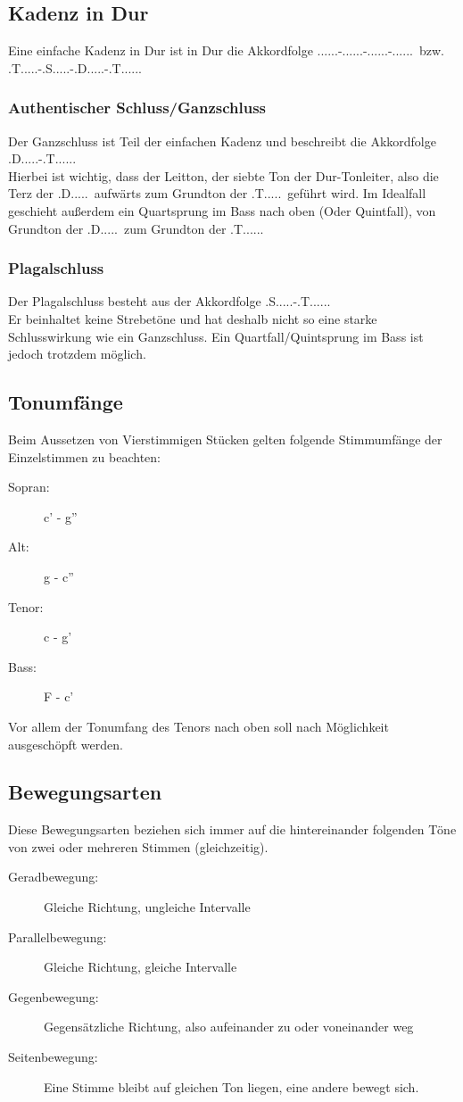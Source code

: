 \documentclass[a4paper]{article}
\newcommand{\dS}[1]{\HH.\uppercase\expandafter{\romannumeral #1\relax}.....} %
\newcommand{\T}{\HH.T.....}
\renewcommand{\S}{\HH.S.....}
\newcommand{\D}{\HH.D.....}
\begin{document}
	\subsection{Kadenz in Dur}
	Eine einfache Kadenz in Dur ist in Dur die Akkordfolge \dS{1}-\dS{4}-\dS{5}-\dS{1}\ bzw.\\ \T-\S-\D-\T.
	\subsubsection{Authentischer Schluss/Ganzschluss}
	Der Ganzschluss ist Teil der einfachen Kadenz und beschreibt die Akkordfolge \D-\T.\\
	Hierbei ist wichtig, dass der Leitton, der siebte Ton der Dur-Tonleiter, also die Terz der \D\ aufwärts zum Grundton der \T\ geführt wird. Im Idealfall geschieht außerdem ein Quartsprung im Bass nach oben (Oder Quintfall), von Grundton der \D\ zum Grundton der \T.
	
	\subsubsection{Plagalschluss}
	Der Plagalschluss besteht aus der Akkordfolge \S-\T.\\
	Er beinhaltet keine Strebetöne und hat deshalb nicht so eine starke Schlusswirkung wie ein Ganzschluss. Ein Quartfall/Quintsprung im Bass ist jedoch trotzdem möglich.
	
	\subsection{Tonumfänge}
	Beim Aussetzen von Vierstimmigen Stücken gelten folgende Stimmumfänge der Einzelstimmen zu beachten:
	\begin{description}
		\item [Sopran:] c' - g''
		\item [Alt:] g - c''
		\item [Tenor:] c - g'
		\item [Bass:] F - c'
	\end{description}
	Vor allem der Tonumfang des Tenors nach oben soll nach Möglichkeit ausgeschöpft werden.
	
	\subsection{Bewegungsarten}
	Diese Bewegungsarten beziehen sich immer auf die hintereinander folgenden Töne von zwei oder mehreren Stimmen (gleichzeitig).
	\begin{description}
		\item [Geradbewegung:] Gleiche Richtung, ungleiche Intervalle
		\item [Parallelbewegung:] Gleiche Richtung, gleiche Intervalle
		\item [Gegenbewegung:] Gegensätzliche Richtung, also aufeinander zu oder voneinander weg
		\item [Seitenbewegung:] Eine Stimme bleibt auf gleichen Ton liegen, eine andere bewegt sich.
	\end{description}
\end{document}
